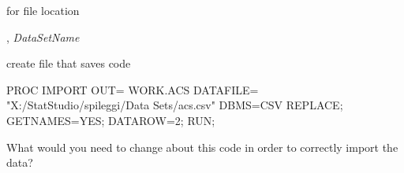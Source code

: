 \begin{frame}
\bi
\item {}
\item {}
\item {} for file location 
\item {},  \emph{DataSetName} 
\item {} create  file that saves  code
\item {}
\ei
\end{frame}

\begin{frame}[fragile]
\hspace*{-0.25in}
\footnotesize
\begin{code}{.0}
PROC IMPORT
   OUT= WORK.ACS
   DATAFILE= "X:/StatStudio/spileggi/Data Sets/acs.csv" 
   DBMS=CSV REPLACE;
   GETNAMES=YES;
   DATAROW=2;
RUN;
\end{code}
\emp
\vskip15pt
\oyo What would you need to change about this code in order to correctly import the data?
\end{frame}


 